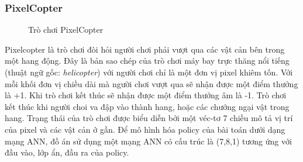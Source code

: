 \subsubsection{PixelCopter}
\begin{figure}[h!]
    \centering
    \caption{Trò chơi PixelCopter}
    \label{fig:flappybird}
\end{figure}
Pixelcopter là trò chơi đòi hỏi người chơi phải vượt qua các vật cản bên trong một hang động. Đây là bản sao chép của trò chơi máy bay trực thăng nổi tiếng (thuật ngữ gốc: \emph{helicopter}) với người chơi chỉ là một đơn vị pixel khiêm tốn. 
Với mỗi khối đơn vị chiều dài mà người chơi vượt qua sẽ nhận được một điểm thưởng là +1. Khi trò chơi kết thúc sẽ nhận được một điểm thưởng âm là -1. Trò chơi kết thúc khi người choi va đập vào thành hang, hoặc các chướng ngại vật trong hang. Trạng thái của trò chơi được biểu diễn bởi một véc-tơ 7 chiều mô tả vị trí của pixel và các vật cản ở gần. Để mô hình hóa policy của bài toán dưới dạng mạng ANN, đồ án sử dụng một mạng ANN có cấu trúc là (7,8,1) tương ứng với đầu vào, lớp ẩn, đầu ra của policy.

